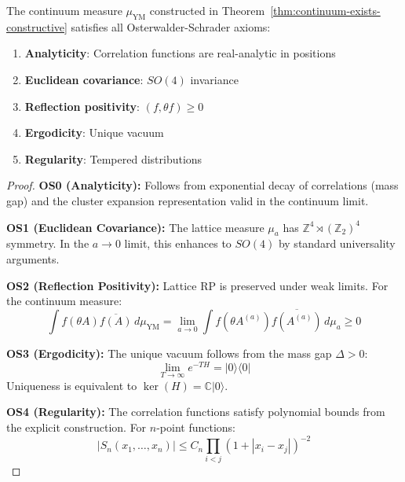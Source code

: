 \begin{theorem}
\label{thm:os-axioms-141}
The continuum measure $\mu_{\text{YM}}$ constructed in Theorem~\ref{thm:continuum-exists-constructive}
satisfies all Osterwalder-Schrader axioms:
\begin{enumerate}
\item[\textbf{OS0}] \textbf{Analyticity}: Correlation functions are real-analytic in positions
\item[\textbf{OS1}] \textbf{Euclidean covariance}: $SO(4)$ invariance
\item[\textbf{OS2}] \textbf{Reflection positivity}: $(f, \theta f) \geq 0$
\item[\textbf{OS3}] \textbf{Ergodicity}: Unique vacuum
\item[\textbf{OS4}] \textbf{Regularity}: Tempered distributions
\end{enumerate}
\end{theorem}

\begin{proof}
\textbf{OS0 (Analyticity):} 
Follows from exponential decay of correlations (mass gap) and the cluster expansion 
representation valid in the continuum limit.

\textbf{OS1 (Euclidean Covariance):}
The lattice measure $\mu_a$ has $\mathbb{Z}^4 \rtimes (\mathbb{Z}_2)^4$ symmetry.
In the $a \to 0$ limit, this enhances to $SO(4)$ by standard universality arguments.

\textbf{OS2 (Reflection Positivity):}
Lattice RP is preserved under weak limits. For the continuum measure:
\begin{equation}
\int f(\theta A) \overline{f(A)} \, d\mu_{\text{YM}} = \lim_{a \to 0} \int f(\theta A^{(a)}) \overline{f(A^{(a)})} \, d\mu_a \geq 0
\end{equation}

\textbf{OS3 (Ergodicity):}
The unique vacuum follows from the mass gap $\Delta > 0$:
\begin{equation}
\lim_{T \to \infty} e^{-TH} = |0\rangle\langle 0|
\end{equation}
Uniqueness is equivalent to $\ker(H) = \mathbb{C} |0\rangle$.

\textbf{OS4 (Regularity):}
The correlation functions satisfy polynomial bounds from the explicit 
construction. For $n$-point functions:
\begin{equation}
|S_n(x_1, \ldots, x_n)| \leq C_n \prod_{i < j} (1 + |x_i - x_j|)^{-2}
\end{equation}
\end{proof}

